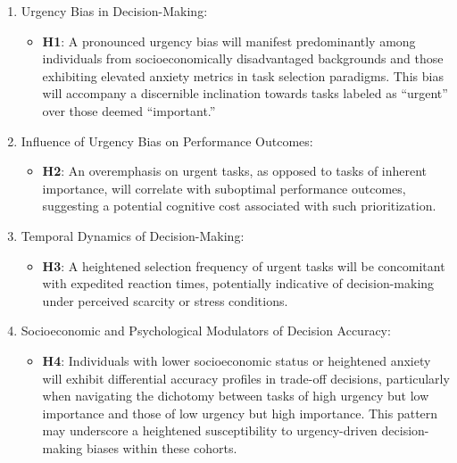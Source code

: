 \documentclass[
]{article}
\providecommand{\tightlist}{%
  \setlength{\itemsep}{0pt}\setlength{\parskip}{0pt}}\usepackage{longtable,booktabs,array}
\begin{document}
\begin{enumerate}
\def\labelenumi{\arabic{enumi}.}
\tightlist
\item
  Urgency Bias in Decision-Making:

  \begin{itemize}
  \tightlist
  \item
    \textbf{H1}: A pronounced urgency bias will manifest predominantly
    among individuals from socioeconomically disadvantaged backgrounds
    and those exhibiting elevated anxiety metrics in task selection
    paradigms. This bias will accompany a discernible inclination
    towards tasks labeled as ``urgent'' over those deemed ``important.''
  \end{itemize}
\item
  Influence of Urgency Bias on Performance Outcomes:

  \begin{itemize}
  \tightlist
  \item
    \textbf{H2}: An overemphasis on urgent tasks, as opposed to tasks of
    inherent importance, will correlate with suboptimal performance
    outcomes, suggesting a potential cognitive cost associated with such
    prioritization.
  \end{itemize}
\item
  Temporal Dynamics of Decision-Making:

  \begin{itemize}
  \tightlist
  \item
    \textbf{H3}: A heightened selection frequency of urgent tasks will
    be concomitant with expedited reaction times, potentially indicative
    of decision-making under perceived scarcity or stress conditions.
  \end{itemize}
\item
  Socioeconomic and Psychological Modulators of Decision Accuracy:

  \begin{itemize}
  \tightlist
  \item
    \textbf{H4}: Individuals with lower socioeconomic status or
    heightened anxiety will exhibit differential accuracy profiles in
    trade-off decisions, particularly when navigating the dichotomy
    between tasks of high urgency but low importance and those of low
    urgency but high importance. This pattern may underscore a
    heightened susceptibility to urgency-driven decision-making biases
    within these cohorts.
  \end{itemize}
\end{enumerate}
\end{document}
